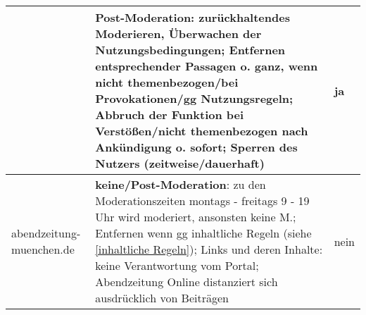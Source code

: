 \begin{longtable}{p{24mm}p{98mm}p{11mm}}
& {\bfseries Post-Moderation}: zurückhaltendes Moderieren, Überwachen der
  Nutzungsbedingungen; Entfernen entsprechender Passagen o. ganz, wenn nicht
  themenbezogen/bei Provokationen/gg Nutzungsregeln; Abbruch der
  Funktion bei Verstößen/nicht themenbezogen nach Ankündigung o. sofort;
  Sperren  des Nutzers (zeitweise/dauerhaft)
  & \centerline{ja}
\\\midrule

abendzeitung-muenchen.de

& {\bfseries keine/Post-Moderation}: zu den Moderationszeiten montags - freitags 9 - 19 Uhr
wird moderiert, ansonsten keine M.; Entfernen wenn gg inhaltliche Regeln (siehe \ref{inhaltliche Regeln}); 
Links und  deren Inhalte: keine Verantwortung vom Portal; Abendzeitung Online distanziert sich
ausdrücklich von Beiträgen
  & \centerline{nein}


\end{longtable}

\endgroup

